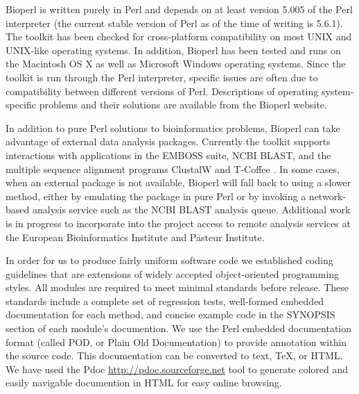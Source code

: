 \documentclass[12pt]{article}
\begin{document}
Bioperl is written purely in Perl and depends on at least version
5.005 of the Perl interpreter (the current stable version of Perl as
of the time of writing is 5.6.1).  The toolkit has been checked for
cross-platform compatibility on most UNIX and UNIX-like operating
systems.  In addition, Bioperl has been tested and runs on the
Macintosh OS X as well as Microsoft Windows operating systems.  Since
the toolkit is run through the Perl interpreter, specific issues are
often due to compatibility between different versions of Perl.
Descriptions of operating system-specific problems and their solutions
are available from the Bioperl website.

In addition to pure Perl solutions to bioinformatics problems, Bioperl
can take advantage of external data analysis packages.  Currently the
toolkit supports interactions with applications in the EMBOSS
\cite{emboss} suite, NCBI BLAST, and the multiple sequence alignment
programs ClustalW \cite{clustalw} and T-Coffee \cite{tcoffee}.  In
some cases, when an external package is not available, Bioperl will
fall back to using a slower method, either by emulating the package in
pure Perl or by invoking a network-based analysis service such as the
NCBI BLAST analysis queue.  Additional work is in progress to
incorporate into the project access to remote analysis services at the
European Bioinformatics Institute and Pasteur Institute.

In order for us to produce fairly uniform software code we established
coding guidelines that are extensions of widely accepted
object-oriented
programming styles.  All modules are required to meet minimal
standards before release.  These standards include a complete set
of regression tests, well-formed embedded documentation for each
method, and concise example code in the SYNOPSIS section of each
module's documention.  We use the Perl embedded documentation format (called
POD, or Plain Old Documentation) to provide annotation within
the source code.  This documentation can be converted to text, TeX, or
HTML.  We have used the Pdoc \url{http://pdoc.sourceforge.net} tool to
generate colored and easily navigable documention in HTML for easy online
browsing.
\end{document}
